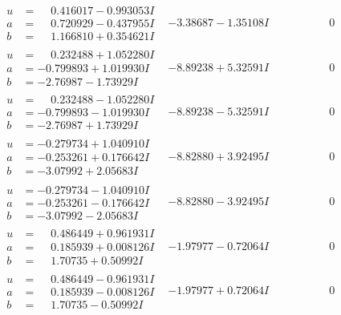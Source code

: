 \documentclass[1p]{elsarticle_modified}
\theoremstyle{definition}
\begin{document}
$$\begin{array}{c|c|c}
\begin{aligned}
u &= \phantom{-}0.416017 - 0.993053 I \\
a &= \phantom{-}0.720929 - 0.437955 I \\
b &= \phantom{-}1.166810 + 0.354621 I\end{aligned}
 & -3.38687 - 1.35108 I & \phantom{-0.000000 } 0 \\ \hline\begin{aligned}
u &= \phantom{-}0.232488 + 1.052280 I \\
a &= -0.799893 + 1.019930 I \\
b &= -2.76987 - 1.73929 I\end{aligned}
 & -8.89238 + 5.32591 I & \phantom{-0.000000 } 0 \\ \hline\begin{aligned}
u &= \phantom{-}0.232488 - 1.052280 I \\
a &= -0.799893 - 1.019930 I \\
b &= -2.76987 + 1.73929 I\end{aligned}
 & -8.89238 - 5.32591 I & \phantom{-0.000000 } 0 \\ \hline\begin{aligned}
u &= -0.279734 + 1.040910 I \\
a &= -0.253261 + 0.176642 I \\
b &= -3.07992 + 2.05683 I\end{aligned}
 & -8.82880 + 3.92495 I & \phantom{-0.000000 } 0 \\ \hline\begin{aligned}
u &= -0.279734 - 1.040910 I \\
a &= -0.253261 - 0.176642 I \\
b &= -3.07992 - 2.05683 I\end{aligned}
 & -8.82880 - 3.92495 I & \phantom{-0.000000 } 0 \\ \hline\begin{aligned}
u &= \phantom{-}0.486449 + 0.961931 I \\
a &= \phantom{-}0.185939 + 0.008126 I \\
b &= \phantom{-}1.70735 + 0.50992 I\end{aligned}
 & -1.97977 - 0.72064 I & \phantom{-0.000000 } 0 \\ \hline\begin{aligned}
u &= \phantom{-}0.486449 - 0.961931 I \\
a &= \phantom{-}0.185939 - 0.008126 I \\
b &= \phantom{-}1.70735 - 0.50992 I\end{aligned}
 & -1.97977 + 0.72064 I & \phantom{-0.000000 } 0 \\ \hline\begin{aligned}

\end{aligned}
\end{array}$$
\end{document}
